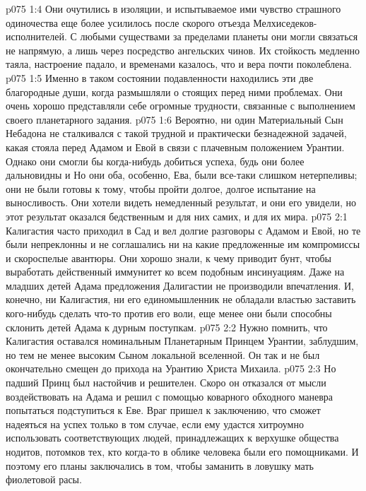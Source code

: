 \vs p075 1:4 Они очутились в изоляции, и испытываемое ими чувство страшного одиночества еще более усилилось после скорого отъезда Мелхиседеков\hyp{}исполнителей. С любыми существами за пределами планеты они могли связаться не напрямую, а лишь через посредство ангельских чинов. Их стойкость медленно таяла, настроение падало, и временами казалось, что и вера почти поколеблена.
\vs p075 1:5 Именно в таком состоянии подавленности находились эти две благородные души, когда размышляли о стоящих перед ними проблемах. Они очень хорошо представляли себе огромные трудности, связанные с выполнением своего планетарного задания.
\vs p075 1:6 Вероятно, ни один Материальный Сын Небадона не сталкивался с такой трудной и практически безнадежной задачей, какая стояла перед Адамом и Евой в связи с плачевным положением Урантии. Однако они смогли бы когда\hyp{}нибудь добиться успеха, будь они более дальновидны и  Но они оба, особенно, Ева, были все\hyp{}таки слишком нетерпеливы; они не были готовы к тому, чтобы пройти долгое, долгое испытание на выносливость. Они хотели видеть немедленный результат, и они его увидели, но этот результат оказался бедственным и для них самих, и для их мира.
\vs p075 2:1 Калигастия часто приходил в Сад и вел долгие разговоры с Адамом и Евой, но те были непреклонны и не соглашались ни на какие предложенные им компромиссы и скороспелые авантюры. Они хорошо знали, к чему приводит бунт, чтобы выработать действенный иммунитет ко всем подобным инсинуациям. Даже на младших детей Адама предложения Далигастии не производили впечатления. И, конечно, ни Калигастия, ни его единомышленник не обладали властью заставить кого\hyp{}нибудь сделать что\hyp{}то против его воли, еще менее они были способны склонить детей Адама к дурным поступкам.
\vs p075 2:2 Нужно помнить, что Калигастия оставался номинальным Планетарным Принцем Урантии, заблудшим, но тем не менее высоким Сыном локальной вселенной. Он так и не был окончательно смещен до прихода на Урантию Христа Михаила.
\vs p075 2:3 Но падший Принц был настойчив и решителен. Скоро он отказался от мысли воздействовать на Адама и решил с помощью коварного обходного маневра попытаться подступиться к Еве. Враг пришел к заключению, что сможет надеяться на успех только в том случае, если ему удастся хитроумно использовать соответствующих людей, принадлежащих к верхушке общества нодитов, потомков тех, кто когда\hyp{}то в облике человека были его помощниками. И поэтому его планы заключались в том, чтобы заманить в ловушку мать фиолетовой расы.
